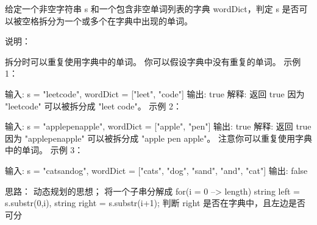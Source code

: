 给定一个非空字符串 s 和一个包含非空单词列表的字典 wordDict，判定 s 是否可以被空格拆分为一个或多个在字典中出现的单词。

说明：

拆分时可以重复使用字典中的单词。
你可以假设字典中没有重复的单词。
示例 1：

输入: s = "leetcode", wordDict = ["leet", "code"]
输出: true
解释: 返回 true 因为 "leetcode" 可以被拆分成 "leet code"。
示例 2：

输入: s = "applepenapple", wordDict = ["apple", "pen"]
输出: true
解释: 返回 true 因为 "applepenapple" 可以被拆分成 "apple pen apple"。
     注意你可以重复使用字典中的单词。
示例 3：

输入: s = "catsandog", wordDict = ["cats", "dog", "sand", "and", "cat"]
输出: false


































思路：
动态规划的思想；
将一个子串分解成 
for(i = 0 --> length)
	string left = s.substr(0,i), 
	string right = s.substr(i+1);
	判断 right 是否在字典中，且左边是否可分
































